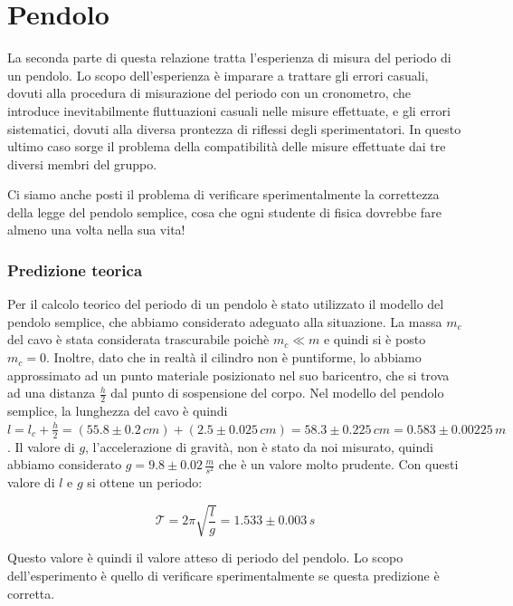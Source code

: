 \newpage

\section{Pendolo}

La seconda parte di questa relazione tratta l'esperienza di misura del periodo
di un pendolo. Lo scopo dell'esperienza è imparare a trattare gli errori
casuali, dovuti alla procedura di misurazione del periodo con un cronometro,
che introduce inevitabilmente fluttuazioni casuali nelle misure effettuate,
e gli errori sistematici, dovuti alla diversa prontezza di riflessi degli
sperimentatori. In questo ultimo caso sorge il problema della 
compatibilità delle misure effettuate dai tre diversi membri del gruppo.

Ci siamo anche posti il problema di verificare sperimentalmente la
correttezza della legge del pendolo semplice, cosa che ogni studente di
fisica dovrebbe fare almeno una volta nella sua vita!

\subsubsection{Predizione teorica}

Per il calcolo teorico del periodo di un pendolo è stato utilizzato il modello del pendolo
semplice, che abbiamo considerato adeguato alla situazione. La massa $m_c$ del
cavo è stata considerata trascurabile poichè $m_c \ll m$ e quindi si è posto
$m_c = 0$. Inoltre, dato che in realtà il cilindro non è puntiforme, lo abbiamo approssimato ad un punto
materiale posizionato nel suo baricentro, che si trova ad una distanza
$\frac{h}{2}$ dal punto di sospensione del corpo.
Nel modello del pendolo semplice, la lunghezza del cavo è quindi
$l = l_c + \frac{h}{2} = (55.8 \pm 0.2 \, cm) + (2.5 \pm 0.025 \, cm) = 58.3 \pm 0.225 \, cm = 0.583 \pm 0.00225 \, m$.
Il valore di $g$, l'accelerazione di gravità, non è stato da noi misurato,
quindi abbiamo considerato $g = 9.8 \pm 0.02 \, \frac{m}{s^2}$ che è un
valore molto prudente. Con questi valore di $l$ e $g$ si ottene un periodo:

\begin{equation*}
    \mathcal{T} = 2\pi \sqrt{\frac{l}{g}} = 1.533 \pm 0.003 \, s 
\end{equation*}

Questo valore è quindi il valore atteso di periodo del pendolo.
Lo scopo dell'esperimento è quello di verificare sperimentalmente se questa predizione
è corretta.

